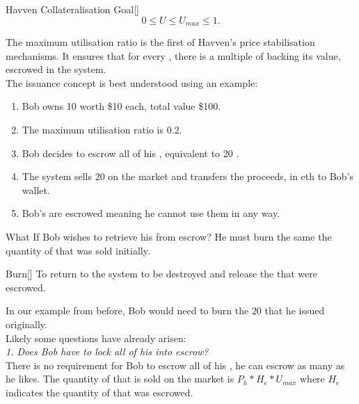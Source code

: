 \begin{namedthm}{Havven Collateralisation Goal}[]
$$ 0 \leq U \leq U_{max} \leq 1.$$
\end{namedthm}

\noindent The maximum utilisation ratio is the first of Havven's price stabilisation mechanisms. It ensures that for every \NOM{}, there is a multiple of \HAV{} backing its value, escrowed in the system. \\

\noindent The issuance concept is best understood using an example:
\begin{enumerate}
\item{Bob owns 10 \HAV{} worth \$10 each, total value \$100.}
\item{The maximum utilisation ratio is 0.2.}
\item{Bob decides to escrow all of his \HAV{}, equivalent to 20 \NOM{}.}
\item{The system sells 20 \NOM{} on the market and transfers the proceeds, in eth to Bob's wallet.}
\item{Bob's \HAV{} are escrowed meaning he cannot use them in any way.}
\end{enumerate} 

\newpage

\noindent What If Bob wishes to retrieve his \HAV{} from escrow? He must burn the same the quantity of \NOM{} that was sold initially. \\

\begin{namedthm}{Burn}[]
To return \NOM{} to the system to be destroyed and release the \HAV{} that were escrowed. 
\end{namedthm}

\noindent In our example from before, Bob would need to burn the $20$ \NOM{} that he issued originally. \\

\noindent Likely some questions have already arisen: \\

\noindent \emph{1. Does Bob have to lock all of his \HAV{} into escrow?} \\ 

\noindent There is no requirement for Bob to escrow all of his \HAV{}, he can escrow as many as he likes. The quantity of \NOM{} that is sold on the market is $ P_h * H_e * U_{max} $ where $H_e$ indicates the quantity of \HAV{} that was escrowed. \\


